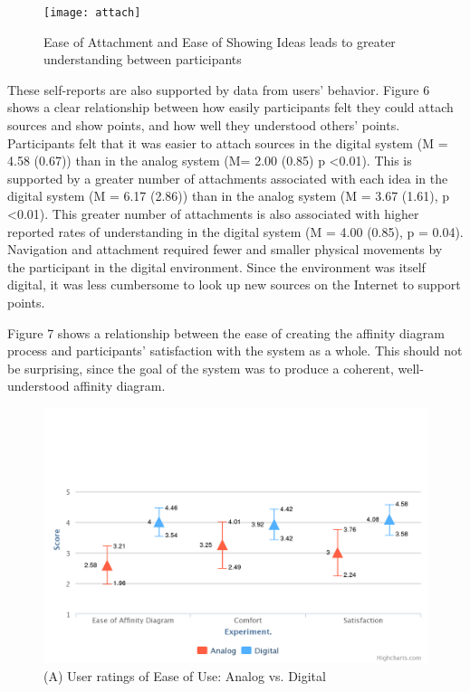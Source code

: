 \documentclass{sigchi}
\begin{document}
\begin{figure}[!h]
\centering
\texttt{[image: attach]}
\caption{Ease of Attachment and Ease of Showing Ideas leads to greater understanding between participants}
\label{fig:figure1}
\end{figure}

These self-reports are also supported by data from users' behavior.  Figure 6 shows a clear relationship between how easily participants felt they could attach sources and show points, and how well they understood others' points. Participants felt that it was easier to attach sources in the digital system (M = 4.58 (0.67)) than in the analog system (M= 2.00 (0.85)  p \textless 0.01). This is supported by a greater number of attachments associated with each idea in the digital system (M = 6.17 (2.86)) than in the analog system (M = 3.67 (1.61), p \textless 0.01). This greater number of attachments is also associated with higher reported rates of understanding in the digital system (M = 4.00 (0.85), p = 0.04). Navigation and attachment required fewer and smaller physical movements by the participant in the digital environment. Since the environment was itself digital, it was less cumbersome to look up new sources on the Internet to support points. 

Figure 7 shows a relationship between the ease of creating the affinity diagram process and participants' satisfaction with the system as a whole. This should not be surprising, since the goal of the system was to produce a coherent, well-understood affinity diagram.

\begin{figure}[!h]
\centering
\includegraphics[width=1.0\columnwidth]{affinity}
\caption{(A) User ratings of Ease of Use: Analog vs. Digital}
\label{fig:figure1}
\end{figure}
\end{document}
